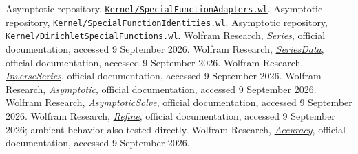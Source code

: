 \documentclass[11pt,letterpaper]{article}
\newcommand{\repo}{https://github.com/VladimirReshetnikov/Asymptotic/blob/921387e5ba1239bfda96e63e64e89bf63d9c41e6/}
\newcommand{\source}[2]{\href{\repo#1}{\nolinkurl{#2}}}
\begin{document}
\begin{thebibliography}{99}
 Asymptotic repository, \source{AsymptoticInverse/Kernel/SpecialFunctionAdapters.wl}{Kernel/SpecialFunctionAdapters.wl}.
 Asymptotic repository, \source{AsymptoticInverse/Kernel/SpecialFunctionIdentities.wl}{Kernel/SpecialFunctionIdentities.wl}.
 Asymptotic repository, \source{AsymptoticInverse/Kernel/DirichletSpecialFunctions.wl}{Kernel/DirichletSpecialFunctions.wl}.
 Wolfram Research, \href{https://reference.wolfram.com/language/ref/Series.html}{\emph{Series}}, official documentation, accessed 9 September 2026.
 Wolfram Research, \href{https://reference.wolfram.com/language/ref/SeriesData.html}{\emph{SeriesData}}, official documentation, accessed 9 September 2026.
 Wolfram Research, \href{https://reference.wolfram.com/language/ref/InverseSeries.html}{\emph{InverseSeries}}, official documentation, accessed 9 September 2026.
 Wolfram Research, \href{https://reference.wolfram.com/language/ref/Asymptotic.html}{\emph{Asymptotic}}, official documentation, accessed 9 September 2026.
 Wolfram Research, \href{https://reference.wolfram.com/language/ref/AsymptoticSolve.html}{\emph{AsymptoticSolve}}, official documentation, accessed 9 September 2026.
 Wolfram Research, \href{https://reference.wolfram.com/language/ref/Refine.html}{\emph{Refine}}, official documentation, accessed 9 September 2026; ambient behavior also tested directly.
 Wolfram Research, \href{https://reference.wolfram.com/language/ref/Accuracy.html}{\emph{Accuracy}}, official documentation, accessed 9 September 2026.
\end{thebibliography}
\end{document}
